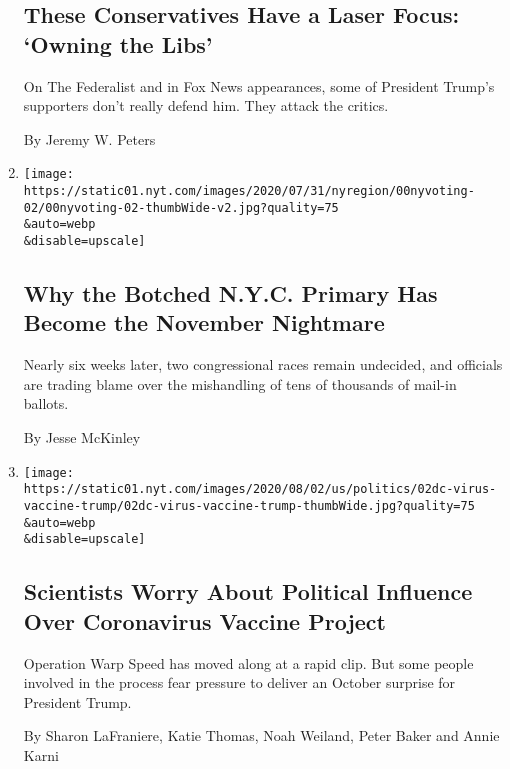 \begin{enumerate}
  \hypertarget{these-conservatives-have-a-laser-focus-owning-the-libs}{%
  \subsection{These Conservatives Have a Laser Focus: `Owning the
  Libs'}\label{these-conservatives-have-a-laser-focus-owning-the-libs}}

  On The Federalist and in Fox News appearances, some of President
  Trump's supporters don't really defend him. They attack the critics.

  By Jeremy W. Peters
\item
  \href{/2020/08/03/nyregion/nyc-mail-ballots-voting.html}{}

  \texttt{[image: https://static01.nyt.com/images/2020/07/31/nyregion/00nyvoting-02/00nyvoting-02-thumbWide-v2.jpg?quality=75\\\&auto=webp\\\&disable=upscale]}

  \hypertarget{why-the-botched-nyc-primary-has-become-the-november-nightmare}{%
  \subsection{Why the Botched N.Y.C. Primary Has Become the November
  Nightmare}\label{why-the-botched-nyc-primary-has-become-the-november-nightmare}}

  Nearly six weeks later, two congressional races remain undecided, and
  officials are trading blame over the mishandling of tens of thousands
  of mail-in ballots.

  By Jesse McKinley
\item
  \href{/2020/08/02/us/politics/coronavirus-vaccine.html}{}

  \texttt{[image: https://static01.nyt.com/images/2020/08/02/us/politics/02dc-virus-vaccine-trump/02dc-virus-vaccine-trump-thumbWide.jpg?quality=75\\\&auto=webp\\\&disable=upscale]}

  \hypertarget{scientists-worry-about-political-influence-over-coronavirus-vaccine-project}{%
  \subsection{Scientists Worry About Political Influence Over
  Coronavirus Vaccine
  Project}\label{scientists-worry-about-political-influence-over-coronavirus-vaccine-project}}

  Operation Warp Speed has moved along at a rapid clip. But some people
  involved in the process fear pressure to deliver an October surprise
  for President Trump.

  By Sharon LaFraniere, Katie Thomas, Noah Weiland, Peter Baker and
  Annie Karni
\end{enumerate}

